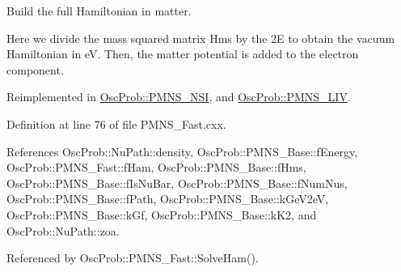 Build the full Hamiltonian in matter.

Here we divide the mass squared matrix Hms by the 2E to obtain the vacuum Hamiltonian in eV. Then, the matter potential is added to the electron component. 

Reimplemented in \hyperlink{classOscProb_1_1PMNS__NSI_ab5c4f4644fbedb8835f6336c553805ce}{Osc\+Prob\+::\+P\+M\+N\+S\+\_\+\+N\+SI}, and \hyperlink{classOscProb_1_1PMNS__LIV_a848fc59ce966126dc6d6e6c32621ad6c}{Osc\+Prob\+::\+P\+M\+N\+S\+\_\+\+L\+IV}.



Definition at line 76 of file P\+M\+N\+S\+\_\+\+Fast.\+cxx.



References Osc\+Prob\+::\+Nu\+Path\+::density, Osc\+Prob\+::\+P\+M\+N\+S\+\_\+\+Base\+::f\+Energy, Osc\+Prob\+::\+P\+M\+N\+S\+\_\+\+Fast\+::f\+Ham, Osc\+Prob\+::\+P\+M\+N\+S\+\_\+\+Base\+::f\+Hms, Osc\+Prob\+::\+P\+M\+N\+S\+\_\+\+Base\+::f\+Is\+Nu\+Bar, Osc\+Prob\+::\+P\+M\+N\+S\+\_\+\+Base\+::f\+Num\+Nus, Osc\+Prob\+::\+P\+M\+N\+S\+\_\+\+Base\+::f\+Path, Osc\+Prob\+::\+P\+M\+N\+S\+\_\+\+Base\+::k\+Ge\+V2eV, Osc\+Prob\+::\+P\+M\+N\+S\+\_\+\+Base\+::k\+Gf, Osc\+Prob\+::\+P\+M\+N\+S\+\_\+\+Base\+::k\+K2, and Osc\+Prob\+::\+Nu\+Path\+::zoa.



Referenced by Osc\+Prob\+::\+P\+M\+N\+S\+\_\+\+Fast\+::\+Solve\+Ham().


